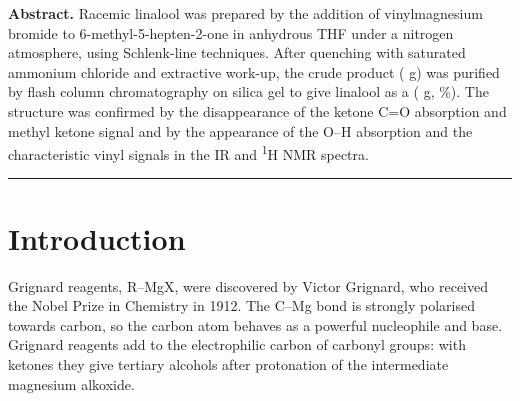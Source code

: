 \documentclass[11pt,a4paper]{article}
\begin{document}


\noindent\textbf{Abstract.} Racemic linalool was prepared by the addition of vinylmagnesium bromide to 6-methyl-5-hepten-2-one in anhydrous THF under a nitrogen atmosphere, using Schlenk-line techniques. After quenching with saturated ammonium chloride and extractive work-up, the crude product ( g) was purified by flash column chromatography on silica gel to give linalool as a  ( g, \%). The structure was confirmed by the disappearance of the ketone C=O absorption and methyl ketone signal and by the appearance of the O--H absorption and the characteristic vinyl signals in the IR and \textsuperscript{1}H NMR spectra.

\noindent\rule{\linewidth}{0.6pt}

\section{Introduction}

Grignard reagents, R--MgX, were discovered by Victor Grignard, who received the Nobel Prize in Chemistry in 1912.\cite{Grignard1900,Manual2026} The C--Mg bond is strongly polarised towards carbon, so the carbon atom behaves as a powerful nucleophile and base. Grignard reagents add to the electrophilic carbon of carbonyl groups: with ketones they give tertiary alcohols after protonation of the intermediate magnesium alkoxide.\cite{Clayden2012}
\end{document}

